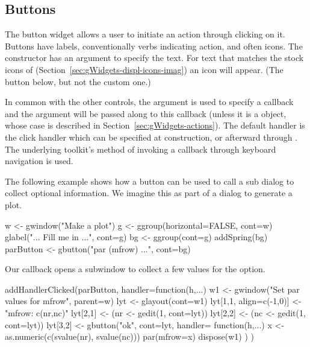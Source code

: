 \subsection{Buttons}
\label{sec:gWidgets-buttons}

The button widget allows a user to initiate an action through clicking
on it. Buttons have labels, conventionally verbs indicating action,
and often icons. The  constructor has an argument
 to specify the text.  For text that matches
the stock icons of 
(Section~\ref{sec:gWidgets-displ-icons-imag}) an icon will
appear. (The  button below, but not the custom  one.)

In common with the other controls, the argument
 is used to specify a callback and the
 argument will be passed along to this
callback (unless it is a  object, whose case is
described in Section~\ref{sec:gWidgets-actions}).  The default handler
is the click handler which can be specified at construction, or
afterward through . The underlying
toolkit's method of invoking a callback through keyboard navigation
is used.

The following example shows how a button can be used to call a sub
dialog to collect optional information. We imagine this as part of a
dialog to generate a plot.

\begin{Schunk}
\begin{Sinput}
 w <- gwindow("Make a plot")
 g <- ggroup(horizontal=FALSE, cont=w)
 glabel("... Fill me in ...", cont=g)
 bg <- ggroup(cont=g)
 addSpring(bg)
 parButton <- gbutton("par (mfrow) ...", cont=bg)
\end{Sinput}
\end{Schunk}
Our callback opens a subwindow to collect a few values for the
 option.
\begin{Schunk}
\begin{Sinput}
 addHandlerClicked(parButton, handler=function(h,...) {
   w1 <- gwindow("Set par values for mfrow", parent=w)
   lyt <- glayout(cont=w1)
   lyt[1,1, align=c(-1,0)] <- "mfrow: c(nr,nc)"
   lyt[2,1] <- (nr <- gedit(1, cont=lyt))
   lyt[2,2] <- (nc <- gedit(1, cont=lyt))
   lyt[3,2] <- gbutton("ok", cont=lyt, handler=
                       function(h,...) {
                         x <- as.numeric(c(svalue(nr), svalue(nc)))
                         par(mfrow=x)
                         dispose(w1)
                       })
 })
\end{Sinput}
\end{Schunk}



